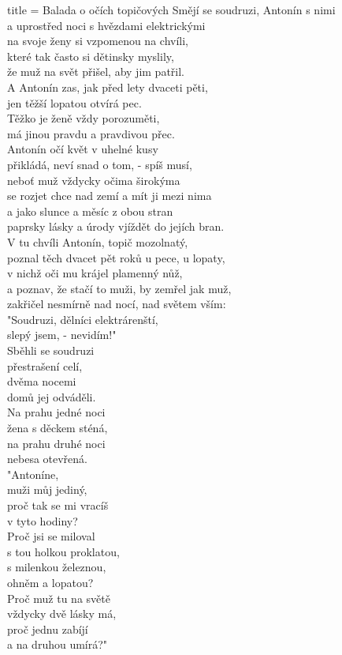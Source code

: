 \begin{song}{title = {Balada o očích topičových}}
Smějí se soudruzi, Antonín s nimi \\
a uprostřed noci s hvězdami elektrickými \\
na svoje ženy si vzpomenou na chvíli, \\
které tak často si dětinsky myslily, \\
že muž na svět přišel, aby jim patřil. \\

A Antonín zas, jak před lety dvaceti pěti, \\
jen těžší lopatou otvírá pec. \\
Těžko je ženě vždy porozuměti, \\
má jinou pravdu a pravdivou přec. \\
Antonín očí květ v uhelné kusy \\
přikládá, neví snad o tom, - spíš musí, \\
neboť muž vždycky očima širokýma \\
se rozjet chce nad zemí a mít ji mezi nima \\
a jako slunce a měsíc z obou stran \\
paprsky lásky a úrody vjíždět do jejích bran. \\
V tu chvíli Antonín, topič mozolnatý, \\
poznal těch dvacet pět roků u pece, u lopaty, \\
v nichž oči mu krájel plamenný nůž, \\
a poznav, že stačí to muži, by zemřel jak muž, \\
zakřičel nesmírně nad nocí, nad světem vším: \\

"Soudruzi, dělníci elektrárenští, \\
slepý jsem, - nevidím!" \\

Sběhli se soudruzi \\
přestrašení celí, \\
dvěma nocemi \\
domů jej odváděli. \\
Na prahu jedné noci \\
žena s děckem sténá, \\
na prahu druhé noci \\
nebesa otevřená. \\

"Antoníne, \\
muži můj jediný, \\
proč tak se mi vracíš \\
v tyto hodiny? \\
Proč jsi se miloval \\
s tou holkou proklatou, \\
s milenkou železnou, \\
ohněm a lopatou? \\
Proč muž tu na světě \\
vždycky dvě lásky má, \\
proč jednu zabíjí \\
a na druhou umírá?" \\


\end{song}
